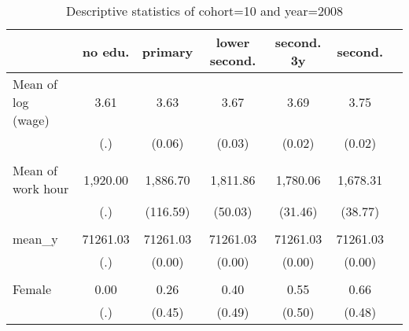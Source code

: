 \begin{table}[htbp]\centering
    \caption{\label{tab:desc-cohort10}Descriptive statistics of cohort=10 and year=2008}
    \begin{tabular}{l*{6}{c}}

        \hline
                        &   no edu.& primary&lower second.&second. 3y&second.\\
        \hline
        Mean of log (wage)&     3.61&     3.63&     3.67&     3.69&     3.75\\
                        &      (.)&   (0.06)&   (0.03)&   (0.02)&   (0.02)\\
        \\
        Mean of work hour& 1,920.00& 1,886.70& 1,811.86& 1,780.06& 1,678.31\\
                        &      (.)& (116.59)&  (50.03)&  (31.46)&  (38.77)\\
        \\
        mean\_{y}          & 71261.03& 71261.03& 71261.03& 71261.03& 71261.03\\
                        &      (.)&   (0.00)&   (0.00)&   (0.00)&   (0.00)\\
        \\
        Female           &     0.00&     0.26&     0.40&     0.55&     0.66\\
                        &      (.)&   (0.45)&   (0.49)&   (0.50)&   (0.48)\\
        \hline
    \end{tabular}
\end{table}